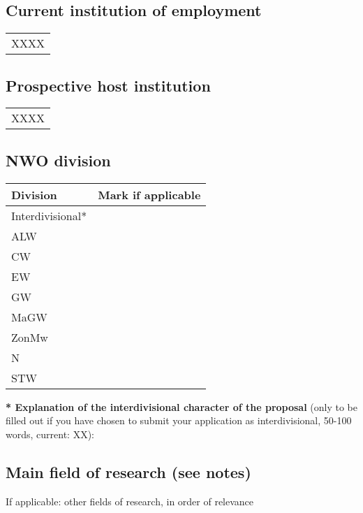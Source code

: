 \subsection{Current institution of employment}\label{sec:currentinst}

\begin{tabular}{l}
XXXX\\
\end{tabular}

\subsection{Prospective host institution }\label{sec:prospinst}

\begin{tabular}{l}
XXXX\\
\end{tabular}


\subsection{NWO division}\label{sec:division}

\begin{table}[h!]
\flushleft
\begin{tabular}{lc}
\hline
\T\B\textbf{Division}&\textbf{Mark if applicable}\\
\hline
\T Interdivisional*\\
ALW\\
CW\\
EW\\
GW\\
MaGW\\
ZonMw\\
N\\
\B STW\\
\hline
\end{tabular}
\end{table}

\noindent\textbf{* Explanation of the interdivisional character of the proposal}
(only to be filled out if you have chosen to submit your application as interdivisional,
{50-100 words, current: XX}):

\subsection{Main field of research (see notes)}\label{sec:mainfield}
If applicable: other fields of research, in order of relevance


